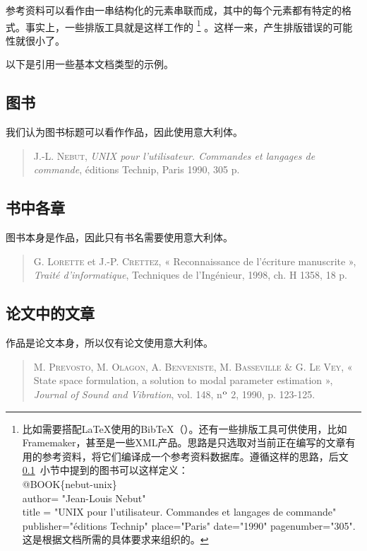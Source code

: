 参考资料可以看作由一串结构化的元素串联而成，其中的每个元素都有特定的格式。事实上，一些排版工具就是这样工作的
    \footnote{比如需要搭配\LaTeX 使用的Bib\TeX（）。还有一些排版工具可供使用，比如Framemaker，甚至是一些XML产品。思路是只选取对当前正在编写的文章有用的参考资料，将它们编译成一个参考资料数据库。遵循这样的思路，后文 \ref{sec6.2.1}~小节中提到的图书可以这样定义：\\
    {\ttfamily 
    @BOOK\{nebut-unix\}\\
    author= "Jean-Louis Nebut"\\
    title = "UNIX pour l'utilisateur. Commandes et langages de commande"\\
    publisher="éditions Technip" place="Paris" date="1990" pagenumber="305".\\
    }
    这是根据文档所需的具体要求来组织的。}
。这样一来，产生排版错误的可能性就很小了。

以下是引用一些基本文档类型的示例。

\subsection{图书}\label{sec6.2.1}

我们认为图书标题可以看作作品，因此使用意大利体。

\begin{quote}
    J.-L. \textsc{Nebut}, \emph{UNIX pour l'utilisateur. Commandes et langages de commande}, éditions Technip, Paris 1990, 305 p.
\end{quote}

\subsection{书中各章}

图书本身是作品，因此只有书名需要使用意大利体。

\begin{quote}
    G. \textsc{Lorette} et J.-P. \textsc{Crettez}, « Reconnaissance de l'écriture manuscrite », \emph{Traité d'informatique}, Techniques de l'Ingénieur, 1998, ch. H 1358, 18 p.
\end{quote}

\subsection{论文中的文章}

作品是论文本身，所以仅有论文使用意大利体。

\begin{quote}
    M. \textsc{Prevosto}, M. \textsc{Olagon}, A. \textsc{Benveniste}, M. \textsc{Basseville} \& G. \textsc{Le Vey}, « State space formulation, a solution to modal parameter estimation », \emph{Journal of Sound and Vibration}, vol. 148, n$^{\rm o}$ 2, 1990, p. 123-125.
\end{quote}

